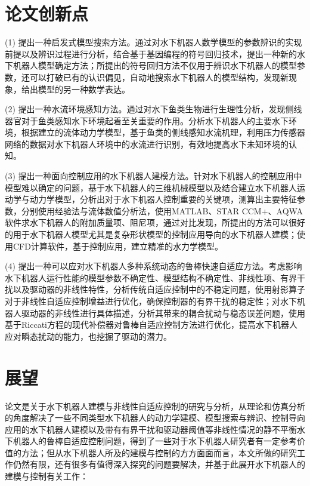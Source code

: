 \section{论文创新点}

(1) 提出一种启发式模型搜索方法。通过对水下机器人数学模型的参数辨识的实现前提以及辨识过程进行分析，结合基于基因编程的符号回归技术，提出一种新的水下机器人模型确定方法；所提出的符号回归方法不仅用于辨识水下机器人的模型参数，还可以打破已有的认识偏见，自动地搜索水下机器人的模型结构，发现新现象，给出模型的另一种数学表达。

(2) 提出一种水流环境感知方法。通过对水下鱼类生物进行生理性分析，发现侧线器官对于鱼类感知水下环境起着至关重要的作用。分析水下机器人的主要水下环境，根据建立的流体动力学模型，基于鱼类的侧线感知水流机理，利用压力传感器网络的数据对水下机器人环境中的水流进行识别，有效地提高水下未知环境的认知。

(3) 提出一种面向控制应用的水下机器人建模方法。针对水下机器人的控制应用中模型难以确定的问题，基于水下机器人的三维机械模型以及结合建立水下机器人运动学与动力学模型，分析出对于水下机器人控制重要的关键项，测算出主要特征参数，分别使用经验法与流体数值分析法，使用MATLAB、STAR CCM+、AQWA软件求水下机器人的附加质量项、阻尼项，通过对比发现，所提出的方法可以很好的用于水下机器人模型尤其是复杂形状模型的控制应用导向的水下机器人建模；使用CFD计算软件，基于控制应用，建立精准的水力学模型。

(4) 提出一种可以应对水下机器人多种系统动态的鲁棒快速自适应方法。考虑影响水下机器人运行性能的模型参数不确定性、模型结构不确定性、非线性项、有界干扰以及驱动器的非线性特性，分析传统自适应控制中的不稳定问题，使用射影算子对于非线性自适应控制增益进行优化，确保控制器的有界干扰的稳定性；对水下机器人驱动器的非线性进行具体描述，分析其带来的耦合扰动与稳态误差问题，使用基于Riccati方程的现代补偿器对鲁棒自适应控制方法进行优化，提高水下机器人应对瞬态扰动的能力，也挖掘了驱动的潜力。



\section{展望}
论文是关于水下机器人建模与非线性自适应控制的研究与分析，从理论和仿真分析的角度解决了一些不同类型水下机器人的动力学建模、模型搜索与辨识、控制导向应用的水下机器人建模以及带有有界干扰和驱动器阈值等非线性情况的静不平衡水下机器人的鲁棒自适应控制问题，得到了一些对于水下机器人研究者有一定参考价值的方法；但从水下机器人所及的建模与控制的方方面面而言，本文所做的研究工作仍然有限，还有很多有值得深入探究的问题要解决，并基于此展开水下机器人的建模与控制有关工作：


